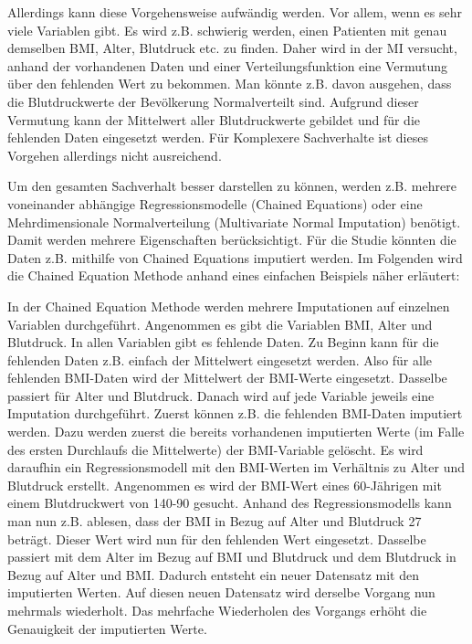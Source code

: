 Allerdings kann diese Vorgehensweise aufwändig werden. Vor allem, wenn es sehr viele Variablen gibt. Es wird z.B. 
schwierig werden, einen Patienten mit genau demselben BMI, Alter, Blutdruck etc. zu finden. Daher wird in 
der MI versucht, anhand der vorhandenen Daten und einer Verteilungsfunktion eine Vermutung über den fehlenden Wert zu 
bekommen. Man könnte z.B. davon ausgehen, dass die Blutdruckwerte der Bevölkerung Normalverteilt sind. Aufgrund dieser Vermutung 
kann der Mittelwert aller Blutdruckwerte gebildet und für die fehlenden Daten eingesetzt werden. Für Komplexere Sachverhalte ist 
dieses Vorgehen allerdings nicht ausreichend. \autocite[1089]{Donders2006}

Um den gesamten Sachverhalt besser darstellen zu können, werden z.B. mehrere voneinander abhängige Regressionsmodelle 
(Chained Equations) oder eine Mehrdimensionale Normalverteilung (Multivariate Normal Imputation) benötigt. \autocite[489]{Spratt2010} Damit 
werden mehrere Eigenschaften berücksichtigt. Für die Studie könnten die Daten z.B. mithilfe von Chained Equations imputiert werden. Im Folgenden wird
die Chained Equation Methode anhand eines einfachen Beispiels näher erläutert:

In der Chained Equation Methode werden mehrere Imputationen auf einzelnen Variablen durchgeführt. Angenommen es gibt die Variablen BMI, Alter und Blutdruck. 
In allen Variablen gibt es fehlende Daten. Zu Beginn kann für die fehlenden Daten z.B. einfach der Mittelwert eingesetzt werden. Also für alle fehlenden 
BMI-Daten wird der Mittelwert der BMI-Werte eingesetzt. Dasselbe passiert für Alter und Blutdruck. Danach wird auf jede Variable jeweils eine Imputation durchgeführt. 
Zuerst können z.B. die fehlenden BMI-Daten imputiert werden. Dazu werden zuerst die bereits vorhandenen imputierten Werte (im Falle des ersten Durchlaufs die Mittelwerte)
der BMI-Variable gelöscht. Es wird daraufhin ein Regressionsmodell mit den BMI-Werten im Verhältnis zu Alter und Blutdruck erstellt. Angenommen es wird der BMI-Wert
eines 60-Jährigen mit einem Blutdruckwert von 140-90 gesucht. Anhand des Regressionsmodells kann man nun z.B. ablesen, dass der BMI in Bezug auf Alter und Blutdruck 27 beträgt.
Dieser Wert wird nun für den fehlenden Wert eingesetzt. Dasselbe passiert mit dem Alter im Bezug auf BMI und Blutdruck und dem Blutdruck in Bezug auf Alter und BMI. Dadurch
entsteht ein neuer Datensatz mit den imputierten Werten. Auf diesen neuen Datensatz wird derselbe Vorgang nun mehrmals wiederholt. \autocite[108]{Tilling2016}
Das mehrfache Wiederholen des Vorgangs erhöht die Genauigkeit der imputierten Werte.  


